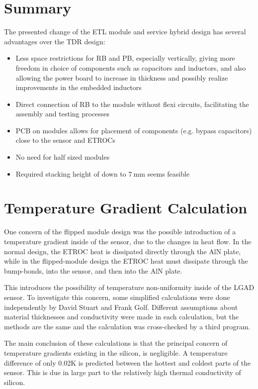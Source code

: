 \documentclass[11pt]{article}
\begin{document}
\section{Summary}

The presented change of the ETL module and service hybrid design has several advantages over the TDR design:
\begin{itemize}
  \item Less space restrictions for RB and PB, especially vertically, giving more freedom in choice of components such as capacitors and inductors, and also allowing the power board to increase in thickness and possibly realize improvements in the embedded inductors
  \item Direct connection of RB to the module without flexi circuits, facilitating the assembly and testing processes
  \item PCB on modules allows for placement of components (e.g. bypass capacitors) close to the sensor and ETROCs
  \item No need for half sized modules
  \item Required stacking height of down to $7~\mathrm{mm}$ seems feasible
\end{itemize}

\newpage
\appendix
\appendixpage
\addappheadtotoc

\section{Temperature Gradient Calculation}
\label{sec:temperature-calculation}

One concern of the flipped module design was the possible introduction of a temperature gradient inside of the sensor, due to the changes in heat flow. In the normal design, the ETROC heat is dissipated directly through the AlN plate, while in the flipped-module design the ETROC heat must dissipate through the bump-bonds, into the sensor, and then into the AlN plate.

This introduces the possibility of temperature non-uniformity inside of the LGAD sensor. To investigate this concern, some simplified calculations were done independently by David Stuart and Frank Golf. Different assumptions about material thicknesses and conductivity were made in each calculation, but the methods are the same and the calculation was cross-checked by a third program.

The main conclusion of these calculations is that the principal concern of temperature gradients existing in the silicon, is negligible. A temperature difference of only 0.02K is predicted between the hottest and coldest parts of the sensor. This is due in large part to the relatively high thermal conductivity of silicon.
\end{document}
